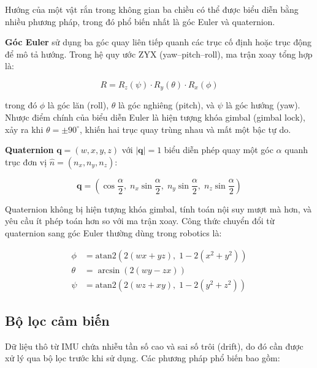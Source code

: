 Hướng của một vật rắn trong không gian ba chiều có thể được biểu diễn bằng nhiều phương pháp, trong đó phổ biến nhất là góc Euler và quaternion.

\textbf{Góc Euler} sử dụng ba góc quay liên tiếp quanh các trục cố định hoặc trục động để mô tả hướng. Trong hệ quy ước ZYX (yaw--pitch--roll), ma trận xoay tổng hợp là:

\begin{equation}
    R = R_z(\psi) \cdot R_y(\theta) \cdot R_x(\phi)
\end{equation}

trong đó $\phi$ là góc lăn (roll), $\theta$ là góc nghiêng (pitch), và $\psi$ là góc hướng (yaw). Nhược điểm chính của biểu diễn Euler là hiện tượng khóa gimbal (gimbal lock), xảy ra khi $\theta = \pm 90^\circ$, khiến hai trục quay trùng nhau và mất một bậc tự do.

\textbf{Quaternion} $\mathbf{q} = (w, x, y, z)$ với $|\mathbf{q}| = 1$ biểu diễn phép quay một góc $\alpha$ quanh trục đơn vị $\hat{n} = (n_x, n_y, n_z)$:

\begin{equation}
    \mathbf{q} = \left(\cos\frac{\alpha}{2},\; n_x \sin\frac{\alpha}{2},\; n_y \sin\frac{\alpha}{2},\; n_z \sin\frac{\alpha}{2}\right)
\end{equation}

Quaternion không bị hiện tượng khóa gimbal, tính toán nội suy mượt mà hơn, và yêu cầu ít phép toán hơn so với ma trận xoay. Công thức chuyển đổi từ quaternion sang góc Euler thường dùng trong robotics là:

\begin{align}
    \phi   &= \text{atan2}\left(2(w x + y z),\; 1 - 2(x^2 + y^2)\right) \\
    \theta &= \arcsin\left(2(w y - z x)\right) \\
    \psi   &= \text{atan2}\left(2(w z + x y),\; 1 - 2(y^2 + z^2)\right)
\end{align}

\subsection{Bộ lọc cảm biến}

Dữ liệu thô từ IMU chứa nhiễu tần số cao và sai số trôi (drift), do đó cần được xử lý qua bộ lọc trước khi sử dụng. Các phương pháp phổ biến bao gồm:

